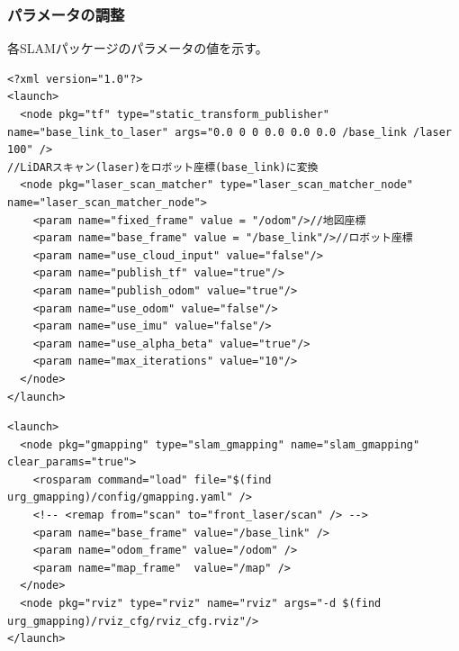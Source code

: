 \clearpage

\subsubsection{パラメータの調整}
各SLAMパッケージのパラメータの値を示す。

\begin{lrbox}{\mybox}
\begin{lstlisting}[caption=Gmappingのレーザオドメトリのパラメータ,label=slam:s2]
<?xml version="1.0"?>
<launch>
  <node pkg="tf" type="static_transform_publisher" name="base_link_to_laser" args="0.0 0 0 0.0 0.0 0.0 /base_link /laser 100" />
//LiDARスキャン(laser)をロボット座標(base_link)に変換
  <node pkg="laser_scan_matcher" type="laser_scan_matcher_node" name="laser_scan_matcher_node">
    <param name="fixed_frame" value = "/odom"/>//地図座標
    <param name="base_frame" value = "/base_link"/>//ロボット座標
    <param name="use_cloud_input" value="false"/>
    <param name="publish_tf" value="true"/>
    <param name="publish_odom" value="true"/>
    <param name="use_odom" value="false"/>
    <param name="use_imu" value="false"/>
    <param name="use_alpha_beta" value="true"/>
    <param name="max_iterations" value="10"/>
  </node>
</launch>
\end{lstlisting}
\end{lrbox}
\scalebox{.9}{\usebox{\mybox}}

\begin{lrbox}{\mybox}
\begin{lstlisting}[caption=Gmappingの座標系の設定,label=slam:s3]
<launch>
  <node pkg="gmapping" type="slam_gmapping" name="slam_gmapping" clear_params="true">
    <rosparam command="load" file="$(find urg_gmapping)/config/gmapping.yaml" />
    <!-- <remap from="scan" to="front_laser/scan" /> -->
    <param name="base_frame" value="/base_link" />
    <param name="odom_frame" value="/odom" />
    <param name="map_frame"  value="/map" />
  </node>
  <node pkg="rviz" type="rviz" name="rviz" args="-d $(find urg_gmapping)/rviz_cfg/rviz_cfg.rviz"/>
</launch>
\end{lstlisting}
\end{lrbox}
\scalebox{.9}{\usebox{\mybox}}


